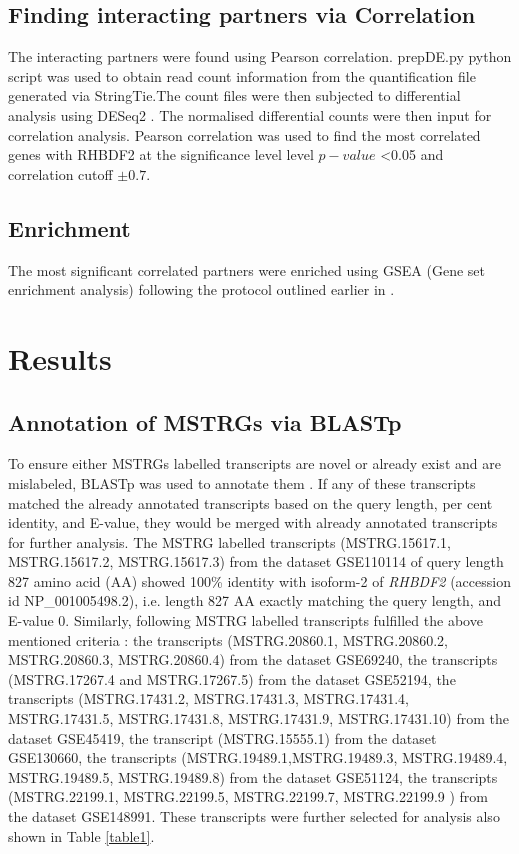 \documentclass[fleqn,10pt,lineno]{wlpeerj}
\begin{document}
\subsection*{Finding interacting partners via Correlation}
The interacting partners were found using Pearson correlation. prepDE.py python script was used to obtain read count information from the quantification file generated via StringTie.The count files were then subjected to differential analysis using DESeq2 \citep{Love2014}. The normalised differential counts were then input for correlation analysis. Pearson correlation was used to find the most correlated genes with RHBDF2  at the significance level  level $p-value$ \textless 0.05 and correlation cutoff $\pm 0.7$.

\subsection*{Enrichment}
The most significant correlated partners were enriched using GSEA (Gene set enrichment analysis) following the protocol outlined earlier in  \citep {Subramanian2005}.

\section*{Results}
\subsection*{Annotation of MSTRGs via BLASTp}
To ensure either MSTRGs labelled transcripts are novel or already exist and are mislabeled, BLASTp was used to annotate them \citep{Acland2013}. If any of these transcripts matched the already annotated transcripts based on the query length, per cent identity, and E-value, they would be merged with already annotated transcripts for further analysis. The MSTRG labelled transcripts (MSTRG.15617.1, MSTRG.15617.2, MSTRG.15617.3) from the dataset GSE110114 of query length 827 amino acid (AA) showed 100\% identity with isoform-2 of \textit{RHBDF2} (accession id NP\_001005498.2), i.e. length 827 AA exactly matching the query length, and E-value 0. Similarly, following MSTRG labelled transcripts fulfilled the above mentioned criteria : the transcripts (MSTRG.20860.1, MSTRG.20860.2, MSTRG.20860.3, MSTRG.20860.4) from the dataset GSE69240, the transcripts (MSTRG.17267.4 and MSTRG.17267.5) from the dataset GSE52194, the transcripts (MSTRG.17431.2, MSTRG.17431.3, MSTRG.17431.4, MSTRG.17431.5, MSTRG.17431.8, MSTRG.17431.9, MSTRG.17431.10) from the dataset GSE45419, the transcript (MSTRG.15555.1) from the dataset GSE130660, the transcripts (MSTRG.19489.1,MSTRG.19489.3, MSTRG.19489.4, MSTRG.19489.5, MSTRG.19489.8) from the dataset GSE51124, the transcripts (MSTRG.22199.1, MSTRG.22199.5, MSTRG.22199.7, MSTRG.22199.9 ) from the dataset GSE148991. These transcripts were further selected for analysis also shown in Table \ref{table1}.
\end{document}
